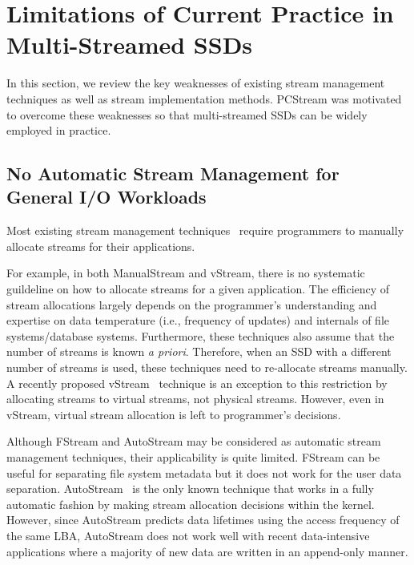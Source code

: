 \section{Limitations of Current Practice in Multi-Streamed SSDs}
In this section, we review the key weaknesses of existing stream management techniques 
as well as stream implementation methods.  
PCStream was motivated to overcome these weaknesses so that multi-streamed
SSDs can be widely employed in practice.

\subsection{No Automatic Stream Management for General I/O Workloads}
Most existing stream management techniques~\cite{MultiStream, Level, vStream} 
require programmers to manually allocate streams for their applications.

{\color{blue}
For example, 
in both ManualStream and vStream, there is no systematic guildeline on how to
allocate streams for a given application. 
The efficiency of stream allocations largely depends on the programmer's 
understanding and expertise on data temperature (i.e., frequency of updates)
and internals of file systems/database systems.
}
Furthermore, these
techniques also assume that the number of streams is known {\it a priori}.  
Therefore, when an SSD with a different number of streams is used, 
these techniques need to re-allocate streams manually.
A recently proposed \textsf{\small vStream}~\cite{vStream} 
technique is an exception to this 
restriction by allocating streams to virtual streams, not physical streams.  
However, even in \textsf{\small vStream}, virtual stream allocation is left to
programmer's decisions.

{\color{blue}
Although \textsf{\small FStream} and \textsf{\small AutoStream} may be considered 
as automatic stream management techniques,
their applicability is quite limited.
\textsf{\small FStream} can be useful for separating file system metadata but it does not
work for the user data separation.
\textsf{\small AutoStream}~\cite{AutoStream} is the only known technique that works in a 
fully automatic fashion by making stream allocation decisions within 
the kernel.
However, since \textsf{\small AutoStream} predicts data lifetimes using the
access frequency of the same LBA, \textsf{\small AutoStream} does not work
well with recent data-intensive 
applications where a majority of
new data are written in an append-only manner.  
}

